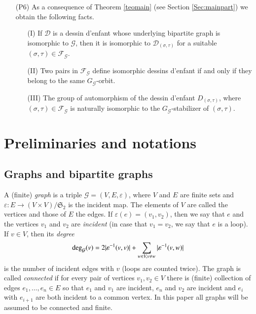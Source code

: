\documentclass[12pt]{amsart}
\theoremstyle{remark}
\begin{document}
\begin{enumerate}
\item[(P6)]  As a consequence of Theorem \ref{teomain} (see Section \ref{Sec:mainpart}) we obtain the following facts.
\begin{enumerate}
\item[(I)] If ${\mathcal D}$ is a dessin d'enfant whose underlying bipartite graph is isomorphic to ${\mathcal G}$, then it is isomorphic to ${\mathcal D}_{(\sigma,\tau)}$ for a suitable $(\sigma,\tau) \in {\mathcal F}_{\mathcal G}$. 

\item[(II)] Two pairs in ${\mathcal F}_{\mathcal G}$ define isomorphic dessins d'enfant if and only if they belong to the same $G_{\mathcal G}$-orbit. 

\item[(III)] The group of automorphism of the dessin d'enfant $D_{(\sigma,\tau)}$, where $(\sigma,\tau) \in {\mathcal F}_{\mathcal G}$ is naturally isomorphic to the $G_{\mathcal G}$-stabilizer of $(\sigma,\tau)$.
\end{enumerate}

\end{enumerate}

{\vspace{0.3cm}}

\section{Preliminaries and notations}\label{Sec:dessins}

\subsection{Graphs and bipartite graphs}\label{Sec:grafo}
A (finite) {\it graph} is a triple ${\mathcal G}=(V,E,\varepsilon)$, where $V$ and $E$ are finite sets and $\varepsilon:E \to (V \times V)/{\mathfrak S}_{2}$ is the incident map. The elements of $V$ are called the vertices and those of $E$ the edges. If $\varepsilon(e)=(v_{1},v_{2})$, then we say that $e$ and the vertices $v_{1}$ and $v_{2}$ are {\it incident} (in case that $v_{1}=v_{2}$, we say that $e$ is a loop). If $v \in V$, then its {\it degree} 
$${\rm deg}_{\mathcal G}(v)=2|\varepsilon^{-1}(v,v)|+\sum_{w \in V, v \neq w} |\varepsilon^{-1}(v,w)|$$
is the number of incident edges with $v$ (loops are counted twice).
The graph is called {\it connected} if for every pair of vertices $v_{1}, v_{2} \in V$ there is (finite) collection of edges $e_{1},\ldots,e_{n} \in E$ so that $e_{1}$ and $v_{1}$ are incident, $e_{n}$ and $v_{2}$ are incident and $e_{i}$ with $e_{i+1}$ are both incident to a common vertex. In this paper all graphs will be assumed to be connected and finite.
\end{document}
